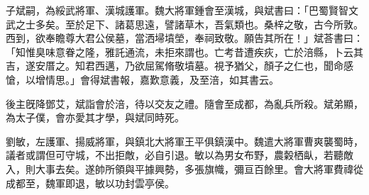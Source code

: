 \begin{pinyinscope}
子斌嗣，為綏武將軍、漢城護軍。魏大將軍鍾會至漢城，與斌書曰：「巴蜀賢智文武之士多矣。至於足下、諸葛思遠，譬諸草木，吾氣類也。桑梓之敬，古今所敦。西到，欲奉瞻尊大君公侯墓，當洒埽墳塋，奉祠致敬。願告其所在！」斌荅書曰：「知惟臭味意眷之隆，雅託通流，未拒來謂也。亡考昔遭疾疢，亡於涪縣，卜云其吉，遂安厝之。知君西邁，乃欲屈駕脩敬墳墓。視予猶父，顏子之仁也，聞命感愴，以增情思。」會得斌書報，嘉歎意義，及至涪，如其書云。

後主旣降鄧艾，斌詣會於涪，待以交友之禮。隨會至成都，為亂兵所殺。斌弟顯，為太子僕，會亦愛其才學，與斌同時死。

劉敏，左護軍、揚威將軍，與鎮北大將軍王平俱鎮漢中。魏遣大將軍曹爽襲蜀時，議者或謂但可守城，不出拒敵，必自引退。敏以為男女布野，農糓栖畒，若聽敵入，則大事去矣。遂帥所領與平據興勢，多張旗幟，彌亘百餘里。會大將軍費禕從成都至，魏軍即退，敏以功封雲亭侯。


\end{pinyinscope}